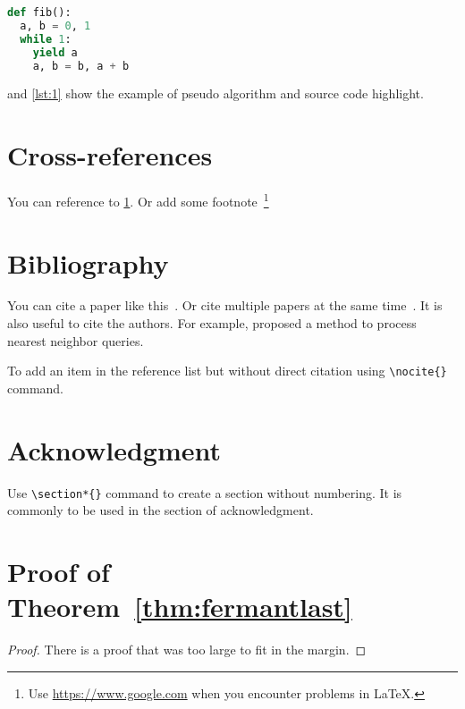 \documentclass[conference]{IEEEtran}
\begin{document}
\begin{lstlisting}[language=Python,float=t,caption={A example of listing},label=lst:1]
def fib():
  a, b = 0, 1
  while 1:
    yield a
    a, b = b, a + b
\end{lstlisting}

 and \cref{lst:1} show the example of pseudo algorithm and source code highlight.

\section{Cross-references}\label{sec:ref}

You can reference to \cref{sec:ref}. Or add some footnote~\footnote{Use \url{https://www.google.com} when you encounter problems in \LaTeX.}

\section{Bibliography}

You can cite a paper like this~\cite{shannon1948}.
Or cite multiple papers at the same time~\cite{merkle1989,roussopoulos1995}.
It is also useful to cite the authors. For example, \citeauthor*{roussopoulos1995} proposed a method to process nearest neighbor queries.

To add an item in the reference list but without direct citation using \verb|\nocite{}| command.

\nocite{latextutoiral}

\section*{Acknowledgment}

Use \verb|\section*{}| command to create a section without numbering. It is commonly to be used in the section of acknowledgment.

\printbibliography

\appendices

\section{Proof of Theorem~\ref{thm:fermantlast}}

\fermantlast*

\begin{proof}
  There is a proof that was too large to fit in the margin.
\end{proof}
\end{document}
